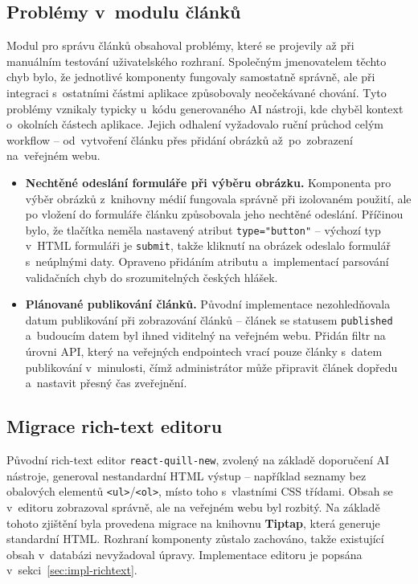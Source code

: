 \subsection{Problémy v~modulu článků}

Modul pro správu článků obsahoval problémy, které se projevily až při manuálním testování uživatelského rozhraní. Společným jmenovatelem těchto chyb bylo, že jednotlivé komponenty fungovaly samostatně správně, ale při integraci s~ostatními částmi aplikace způsobovaly neočekávané chování. Tyto problémy vznikaly typicky u~kódu generovaného AI nástroji, kde chyběl kontext o~okolních částech aplikace. Jejich odhalení vyžadovalo ruční průchod celým workflow -- od~vytvoření článku přes přidání obrázků až~po~zobrazení na~veřejném webu.

\begin{itemize}
    \item \textbf{Nechtěné odeslání formuláře při výběru obrázku.} Komponenta pro výběr obrázků z~knihovny médií fungovala správně při izolovaném použití, ale po vložení do formuláře článku způsobovala jeho nechtěné odeslání. Příčinou bylo, že tlačítka neměla nastavený atribut \texttt{type="button"} -- výchozí typ v~HTML formuláři je \texttt{submit}, takže kliknutí na obrázek odeslalo formulář s~neúplnými daty. Opraveno přidáním atributu a~implementací parsování validačních chyb do srozumitelných českých hlášek.

    \item \textbf{Plánované publikování článků.} Původní implementace nezohledňovala datum publikování při zobrazování článků -- článek se statusem \texttt{published} a~budoucím datem byl ihned viditelný na veřejném webu. Přidán filtr na úrovni API, který na veřejných endpointech vrací pouze články s~datem publikování v~minulosti, čímž administrátor může připravit článek dopředu a~nastavit přesný čas zveřejnění.
\end{itemize}

\subsection{Migrace rich-text editoru}
\label{sec:test-richtext}

Původní rich-text editor \texttt{react-quill-new}, zvolený na základě doporučení AI nástroje, generoval nestandardní HTML výstup -- například seznamy bez obalových elementů \texttt{<ul>}/\texttt{<ol>}, místo toho s~vlastními CSS třídami. Obsah se v~editoru zobrazoval správně, ale na veřejném webu byl rozbitý. Na základě tohoto zjištění byla provedena migrace na knihovnu \textbf{Tiptap}, která generuje standardní HTML. Rozhraní komponenty zůstalo zachováno, takže existující obsah v~databázi nevyžadoval úpravy. Implementace editoru je popsána v~sekci~\ref{sec:impl-richtext}.

